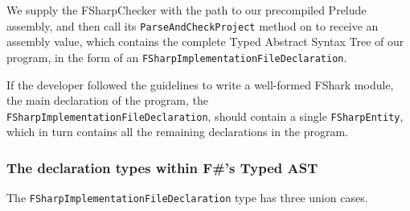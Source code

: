 We supply the FSharpChecker with the path to our precompiled \fshark{}Prelude
assembly, and then call its \texttt{ParseAndCheckProject} method on to receive
an assembly value, which contains the complete Typed Abstract Syntax Tree of our
\fshark{} program, in the form of an \texttt{FSharpImplementationFileDeclaration}.

If the \fshark{} developer followed the guidelines to write a well-formed FShark
module, the main declaration of the program, the
\texttt{FSharpImplementationFileDeclaration}, should contain a single
\texttt{FSharpEntity}, which in turn contains all the remaining declarations in
the program.

\subsubsection*{The declaration types within F\#'s Typed AST}
The \texttt{FSharpImplementationFileDeclaration} type has three union cases.
